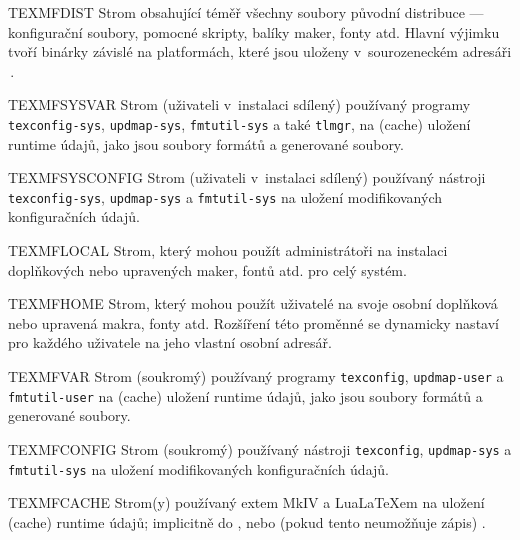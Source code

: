 \documentclass[\classoptions,slovak,english,czech]{\classname}
\begin{document}
\begin{ttdescription}
\item [TEXMFDIST] Strom obsahující téměř všechny soubory původní 
distribuce --- konfigurační soubory, pomocné skripty, balíky maker,
fonty atd. Hlavní výjimku tvoří binárky závislé na platformách, 
které jsou uloženy v~sourozeneckém adresáři \,. 
%
\item [TEXMFSYSVAR] Strom (uživateli v~instalaci sdílený) 
používaný programy 
\verb+texconfig-sys+, \verb+updmap-sys+, \verb+fmtutil-sys+ 
a také \verb+tlmgr+, na (cache) uložení runtime
údajů, jako jsou soubory formátů a generované  soubory.
%
\item [TEXMFSYSCONFIG] Strom (uživateli v~instalaci sdílený) 
používaný nástroji 
\verb+texconfig-sys+, \verb+updmap-sys+ a \verb+fmtutil-sys+ 
na uložení modifikovaných konfiguračních údajů.
%
\item [TEXMFLOCAL] Strom, který mohou použít administrátoři na instalaci 
doplňkových nebo upravených maker, fontů atd. pro celý systém.
%
\item [TEXMFHOME] Strom, který mohou použít uživatelé 
na svoje osobní doplňková nebo upravená makra, fonty atd.
Rozšíření této proměnné se dynamicky nastaví pro
každého uživatele na jeho vlastní osobní adresář. 
%
\item [TEXMFVAR] Strom (soukromý) používaný programy \verb+texconfig+, 
\verb+updmap-user+ a \verb+fmtutil-user+ na (cache) uložení runtime
údajů, jako jsou soubory formátů a generované  soubory.
%
\item [TEXMFCONFIG] Strom (soukromý) používaný nástroji  
\verb+texconfig+, \verb+updmap-sys+ a \verb+fmtutil-sys+ na uložení 
modifikovaných konfiguračních údajů.
%
\item [TEXMFCACHE] Strom(y) používaný \ConTeXt{}extem 
MkIV a Lua\LaTeX{}em
na uložení (cache) runtime údajů; implicitně do , 
nebo (pokud tento neumožňuje zápis) .
\end{ttdescription}
\end{document}
